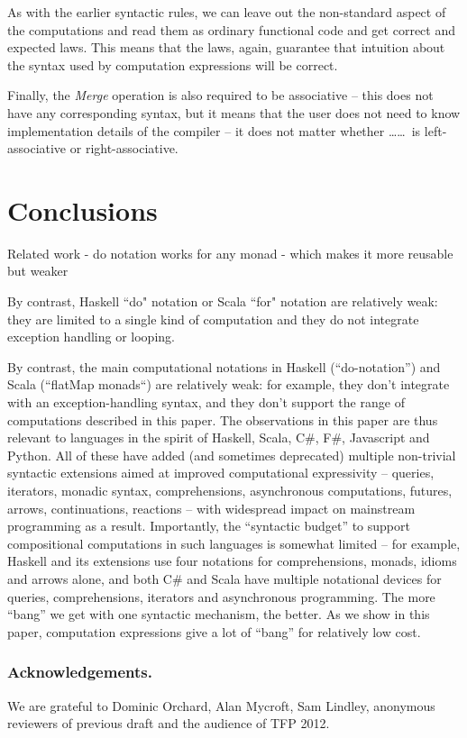 \documentclass[runningheads,a4paper]{llncs}
\begin{document}
As with the earlier syntactic rules, we can leave out the non-standard aspect
of the computations and read them as ordinary functional code and get correct and 
expected laws. This means that the laws, again, guarantee that intuition about the
syntax used by computation expressions will be correct.

Finally, the \emph{Merge} operation is also required to be associative -- this does not have
any corresponding syntax, but it means that the user does not need to know implementation
details of the compiler -- it does not matter whether \ldots{}\ldots\,
is left-associative or right-associative.


\section{Conclusions}
\label{sec:conclusions}

Related work - do notation works for any monad - which makes it more reusable but weaker

By contrast, Haskell ``do" notation or Scala ``for" notation are relatively weak: they are limited
to a single kind of computation and they do not integrate exception handling or looping.

By contrast, the main computational notations in  Haskell (``do-notation'') and Scala (``flatMap monads``) 
are relatively weak: for example, they don't integrate with an exception-handling syntax, and they don't support the
range of computations described in this paper.  The observations in this paper are thus relevant to languages in the spirit of 
Haskell, Scala, C\#, F\#,  Javascript and Python. All of these have added (and sometimes deprecated) 
multiple non-trivial syntactic extensions aimed at improved computational expressivity -- queries, iterators, monadic syntax, 
comprehensions, asynchronous computations, futures, arrows, continuations, reactions -- with 
widespread impact on mainstream programming as a result. Importantly, the ``syntactic budget'' to support 
compositional computations in such languages is somewhat limited -- for example, Haskell and 
its extensions use four notations for  comprehensions, monads, idioms and arrows alone, and both C\# and Scala
have multiple notational devices for queries, comprehensions, iterators and asynchronous programming. 
The more ``bang'' we get with one syntactic mechanism, the better. As we show in this paper, computation expressions
give a lot of ``bang'' for relatively low cost.


\subsubsection{Acknowledgements.} We are grateful to Dominic Orchard, Alan Mycroft, Sam Lindley,
anonymous reviewers of previous draft and the audience of TFP 2012.




\end{document}
